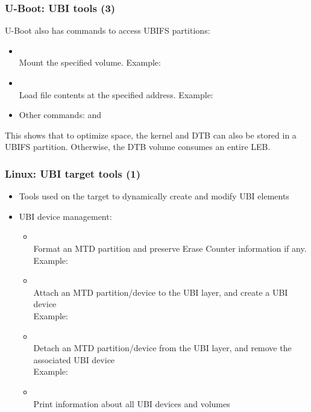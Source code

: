 \begin{frame}
  \frametitle{U-Boot: UBI tools (3)}
  U-Boot also has commands to access UBIFS partitions:
    \begin{itemize}
    \item {}\\
	Mount the specified volume. Example:\\
    \item {}\\
	Load file contents at the specified address. Example:\\
    \item Other commands:  and 
    \end{itemize}
    This shows that to optimize space, the kernel and DTB can
    also be stored in a UBIFS partition. Otherwise, the DTB volume
    consumes an entire LEB.
\end{frame}

\begin{frame}
  \frametitle{Linux: UBI target tools (1)}
  \begin{itemize}
  \item Tools used on the target to dynamically create and modify
      UBI elements
  \item UBI device management:
    \begin{itemize}
    \item {}\\
	Format an MTD partition and preserve Erase Counter information if any.\\
	Example: 
    \item {}\\
	Attach an MTD partition/device to the UBI layer, and create a
        UBI device\\
        Example:  
    \item {}\\
	Detach an MTD partition/device from the UBI layer, and remove
        the associated UBI device\\
        Example: 
    \item {}\\
        Print information about all UBI devices and volumes
    \end{itemize}
  \end{itemize}
\end{frame}

